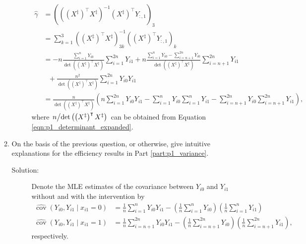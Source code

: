 \documentclass[letterpaper,11pt]{article}
\begin{document}
\begin{enumerate}
\begin{enumerate}
\begin{description}
      \begin{align}
        \hat{\gamma}
        &= \left(\left(\left(X^\ddagger\right)^\intercal X^\ddagger\right)^{-1}\left(X^\ddagger\right)^\intercal Y_{:,1}\right)_3 \label{eqn:p1_gamma_hat}\\
        &= \sum_{k=1}^3 \left(\left(X^\ddagger\right)^\intercal X^\ddagger\right)^{-1}_{3k}
          \left(\left(X^\ddagger\right)^\intercal Y_{:,1}\right)_{k} \nonumber\\
        &= 
          -n\frac{\sum_{i=1}^n Y_{i0}}{\det\left(\left(X^\ddagger\right)^\intercal X^\ddagger\right)}
          \sum_{i=1}^{2n}Y_{i1} +
          n\frac{\sum_{i=1}^n Y_{i0} - \sum_{i=n+1}^{2n}Y_{i0}}{\det\left(\left(X^\ddagger\right)^\intercal X^\ddagger\right)}
          \sum_{i=n+1}^{2n}Y_{i1}
          \nonumber\\
        &~~~+ \frac{n^2}{\det\left(\left(X^\ddagger\right)^\intercal X^\ddagger\right)}
          \sum_{i=1}^{2n}Y_{i0}Y_{i1} \nonumber\\
        &= \frac{n}{\det\left(\left(X^\ddagger\right)^\intercal X^\ddagger\right)}
          \left(n\sum_{i=1}^{2n}Y_{i0}Y_{i1}
          -
          \sum_{i=1}^n Y_{i0}\sum_{i=1}^n Y_{i1}
          -
          \sum_{i=n+1}^{2n} Y_{i0}\sum_{i=n+1}^{2n} Y_{i1}
          \right),
          \nonumber
      \end{align}
      where
      $\left. n\middle/\det\left(\left(X^\ddagger\right)^\intercal X^\ddagger\right)\right.$
      can be obtained from Equation \ref{eqn:p1_determinant_expanded}.
    \end{description}
  \item On the basis of the previous question, or otherwise, give intuitive
    explanations for the efficiency results in Part \ref{part:p1_variance}.
    \begin{description}
    \item[Solution:] Denote the MLE estimates of the covariance between $Y_{i0}$
      and $Y_{i1}$ without and with the intervention by
      \begin{align}
        \hat{\operatorname{cov}}\left(
        Y_{i0}, Y_{i1} \mid x_{i1} = 0
        \right)
        &= \frac{1}{n}\sum_{i=1}^{n} Y_{i0}Y_{i1}
        - \left(\frac{1}{n}\sum_{i=1}^{n} Y_{i0}\right)
          \left(\frac{1}{n}\sum_{i=1}^{n} Y_{i1}\right) \label{eqn:p1_covariance}\\
        \hat{\operatorname{cov}}\left(
        Y_{i0}, Y_{i1} \mid x_{i1} = 1
        \right)
        &= \frac{1}{n}\sum_{i=n+1}^{2n} Y_{i0}Y_{i1}
        - \left(\frac{1}{n}\sum_{i=n+1}^{2n} Y_{i0}\right)
          \left(\frac{1}{n}\sum_{i=n+1}^{2n} Y_{i1}\right),
          \nonumber
      \end{align}
      respectively.
    \end{description}      
  \end{enumerate}
\end{enumerate}
\end{document}
